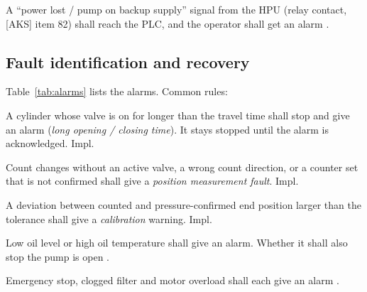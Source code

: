 \documentclass[11pt,a4paper]{article}
\begin{document}
\begin{description}[nosep, leftmargin=14mm, style=sameline]
  \item[FR-14] A ``power lost / pump on backup supply'' signal from the HPU (relay contact, [AKS]
        item 82) shall reach the PLC, and the operator shall get an alarm .
\end{description}

\subsection{Fault identification and recovery}
Table~\ref{tab:alarms} lists the alarms. Common rules:
\begin{description}[nosep, leftmargin=14mm, style=sameline]
  \item[FR-15] A cylinder whose valve is on for longer than the travel time shall stop and give an
        alarm (\emph{long opening / closing time}). It stays stopped until the alarm is
        acknowledged. \hfill Impl.
  \item[FR-16] Count changes without an active valve, a wrong count direction, or a counter set that
        is not confirmed shall give a \emph{position measurement fault}. \hfill Impl.
  \item[FR-17] A deviation between counted and pressure-confirmed end position larger than the
        tolerance shall give a \emph{calibration} warning. \hfill Impl.
  \item[FR-18] Low oil level or high oil temperature shall give an alarm. Whether it shall also
        stop the pump is open .
  \item[FR-19] Emergency stop, clogged filter and motor overload shall each give an alarm
        .
\end{description}
\end{document}

